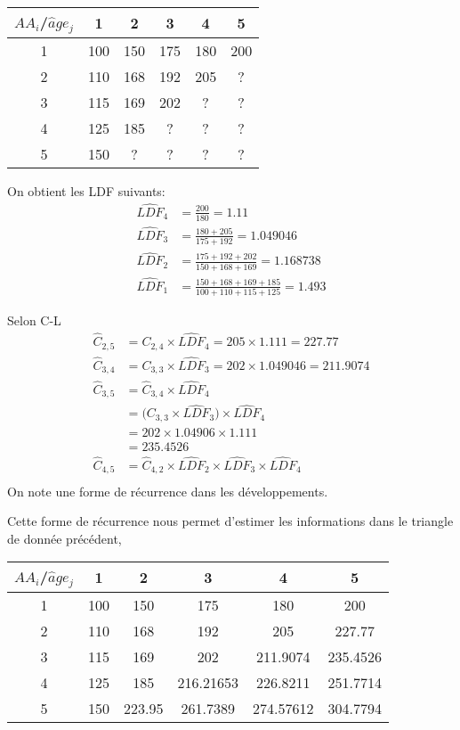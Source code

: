 \documentclass[11pt,french]{report}
\begin{document}
\begin{center}
\begin{tabular}{|c|c|c|c|c|c|}
  \hline
   $AA_i$/$\widehat{a}ge_j$ & 1 & 2 & 3 & 4 & 5 \\
  \hline
  1 & 100 & 150 & 175 & 180 & 200 \\
  2 & 110 & 168 & 192 & 205 & ?\\
  3 & 115 & 169 & 202 & ? & ?\\ 
  4 & 125 & 185 & ? & ? & ? \\
  5 & 150 & ? & ? & ? & ?\\ 
  \hline
\end{tabular}
\end{center}
On obtient les LDF suivants:
\begin{align*}
\widehat{LDF}_4 &= \frac{200}{180} = 1.11 \\
\widehat{LDF}_3 &= \frac{180+205}{175+192} = 1.049046 \\
\widehat{LDF}_2 &= \frac{175+192+202}{150+168+169} = 1.168738 \\
\widehat{LDF}_1 &= \frac{150+168+169+185}{100+110+115+125} = 1.493
\end{align*}

Selon C-L
\begin{align*}
\widehat{C}_{2,5} &= C_{2,4} \times \widehat{LDF}_4 = 205 \times 1.111 = 227.77 \\
\widehat{C}_{3,4} &= C_{3,3} \times \widehat{LDF}_3 = 202 \times 1.049046 = 211.9074\\
\widehat{C}_{3,5} &= \widehat{C}_{3,4} \times \widehat{LDF}_4 \\
&= \Bigg( C_{3,3} \times \widehat{LDF}_3 \Bigg) \times \widehat{LDF}_4 \\
&= 202 \times 1.04906 \times 1.111 \\
&= 235.4526 \\
\widehat{C}_{4,5} &= \widehat{C}_{4,2} \times \widehat{LDF}_2 \times \widehat{LDF}_3 \times \widehat{LDF}_4 \\
\end{align*}
On note une forme de récurrence dans les développements. 

Cette forme de récurrence nous permet d'estimer les informations dans le triangle de donnée précédent,

\begin{center}
\begin{tabular}{|c|c|c|c|c|c|}
  \hline
   $AA_i$/$\widehat{a}ge_j$ & 1 & 2 & 3 & 4 & 5 \\
  \hline
  1 & 100 & 150 & 175 & 180 & 200 \\
  2 & 110 & 168 & 192 & 205 & 227.77\\
  3 & 115 & 169 & 202 & 211.9074 & 235.4526\\ 
  4 & 125 & 185 & 216.21653 & 226.8211 & 251.7714 \\
  5 & 150 & 223.95 & 261.7389 & 274.57612 & 304.7794\\ 
  \hline
\end{tabular}
\end{center}
\end{document}
